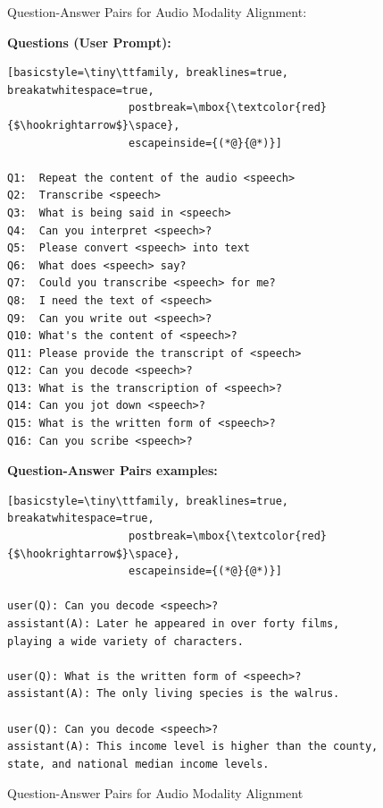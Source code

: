 \documentclass[11pt]{article}
\begin{document}

\begin{figure}[ht]
\begin{AIBox_2}{Question-Answer Pairs for Audio Modality Alignment:}

\begin{minipage}[t]{\textwidth}
{\bf Questions (User Prompt):} \scriptsize
\begin{lstlisting}[basicstyle=\tiny\ttfamily, breaklines=true, breakatwhitespace=true,
                   postbreak=\mbox{\textcolor{red}{$\hookrightarrow$}\space},
                   escapeinside={(*@}{@*)}]

Q1:  Repeat the content of the audio <speech>
Q2:  Transcribe <speech>
Q3:  What is being said in <speech>
Q4:  Can you interpret <speech>?
Q5:  Please convert <speech> into text
Q6:  What does <speech> say?
Q7:  Could you transcribe <speech> for me?
Q8:  I need the text of <speech>
Q9:  Can you write out <speech>?
Q10: What's the content of <speech>?
Q11: Please provide the transcript of <speech>
Q12: Can you decode <speech>?
Q13: What is the transcription of <speech>?
Q14: Can you jot down <speech>?
Q15: What is the written form of <speech>?
Q16: Can you scribe <speech>?
\end{lstlisting}
\end{minipage}

\tcbline

\begin{minipage}[t]{\textwidth}
{\bf Question-Answer Pairs examples:} \scriptsize
\begin{lstlisting}[basicstyle=\tiny\ttfamily, breaklines=true, breakatwhitespace=true,
                   postbreak=\mbox{\textcolor{red}{$\hookrightarrow$}\space},
                   escapeinside={(*@}{@*)}]

user(Q): Can you decode <speech>?
assistant(A): Later he appeared in over forty films, playing a wide variety of characters.

user(Q): What is the written form of <speech>?
assistant(A): The only living species is the walrus.

user(Q): Can you decode <speech>?
assistant(A): This income level is higher than the county, state, and national median income levels.
\end{lstlisting}
\end{minipage}

\end{AIBox_2}
\caption{Question-Answer Pairs for Audio Modality Alignment}
\label{fig:qa_pairs_example}
\end{figure}
\end{document}
